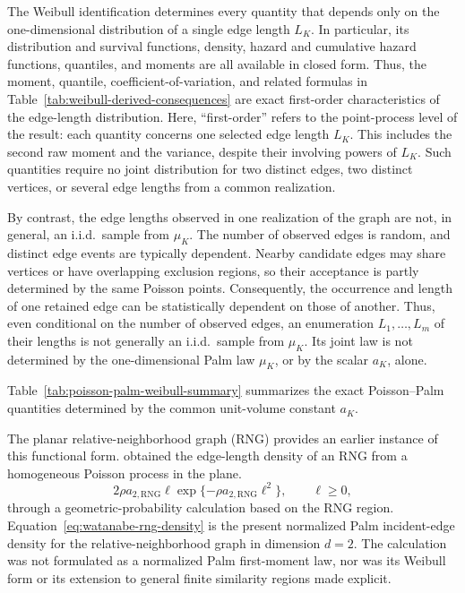 \documentclass[a4paper,fleqn]{cas-dc}
\numberwithin{equation}{section}
\newcommand{\1}{\mathds{1}}
\newcommand{\0}{\mathbf{0}}
\begin{document}
The Weibull identification determines every quantity that depends only on
the one-dimensional distribution of a single edge length \(L_K\). In
particular, its distribution and survival functions, density, hazard
and cumulative hazard functions, quantiles, and moments are all
available in closed form. Thus, the moment, quantile,
coefficient-of-variation, and related formulas in
Table~\ref{tab:weibull-derived-consequences} are exact first-order
characteristics of the edge-length distribution.
Here, ``first-order'' refers to the point-process level of the result:
each quantity concerns one selected edge length \(L_K\). This includes
the second raw moment and the variance, despite their involving powers
of \(L_K\). Such quantities require no joint distribution for two
distinct edges, two distinct vertices, or several edge lengths from a
common realization.

By contrast, the edge lengths observed in one realization of the graph
are not, in general, an i.i.d.\ sample from \(\mu_K\). The number of
observed edges is random, and distinct edge events are typically
dependent. Nearby candidate edges may share vertices or have
overlapping exclusion regions, so their acceptance is partly determined
by the same Poisson points. Consequently, the occurrence and length of
one retained edge can be statistically dependent on those of another.
Thus, even conditional on the number of observed edges, an enumeration
\(L_1,\ldots,L_m\) of their lengths is not generally an i.i.d.\ sample
from \(\mu_K\). Its joint law is not determined by the one-dimensional
Palm law \(\mu_K\), or by the scalar \(a_K\), alone.

Table~\ref{tab:poisson-palm-weibull-summary} summarizes the exact
Poisson--Palm quantities determined by the common unit-volume constant
\(a_K\). 


The planar relative-neighborhood graph (RNG) provides an earlier instance of
this functional form. \citet{watanabe2008evaluating} obtained
the edge-length density of an RNG from a homogeneous Poisson process in the plane.
\begin{equation}
\label{eq:watanabe-rng-density}
2\rho a_{2,\mathrm{RNG}}\ell
\exp\{-\rho a_{2,\mathrm{RNG}}\ell^2\},
\qquad
\ell\geq0,
\end{equation}
through a geometric-probability calculation based on the RNG region.
Equation~\eqref{eq:watanabe-rng-density} is the present normalized
Palm incident-edge density for the relative-neighborhood graph in
dimension $d=2$. The calculation was not formulated as a normalized
Palm first-moment law, nor was its Weibull form or its extension to
general finite similarity regions made explicit.
\end{document}
